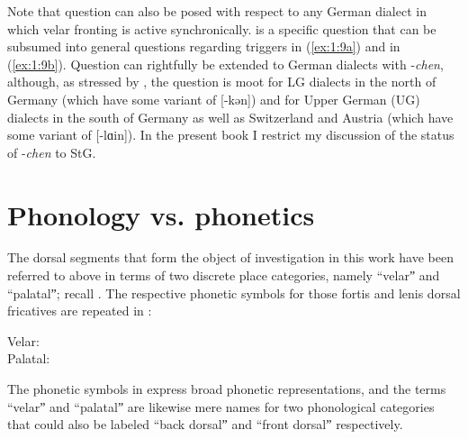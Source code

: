 Note that question  can also be posed with respect to any German dialect in which velar fronting is active synchronically.  is a specific question that can be subsumed into general questions regarding triggers in (\ref{ex:1:9a}) and  in (\ref{ex:1:9b}). Question  can rightfully be extended to German dialects with -\textit{chen}, although, as stressed by \citet{Robinson2001}, the question is moot for LG dialects in the north of Germany (which have some variant of [-kən]) and for Upper German (UG) dialects in the south of Germany as well as Switzerland and Austria (which have some variant of [-lɑin]). In the present book I restrict my discussion of the status of -\textit{chen} to StG.

\section{{Phonology} {vs.} {phonetics}}\label{sec:1.5}

The dorsal segments that form the object of investigation in this work have been referred to above in terms of two discrete place categories, namely “velarˮ and “palatalˮ; recall . The respective phonetic symbols for those fortis and lenis dorsal fricatives are repeated in :

\ea%
    \label{ex:1:13}
      Velar:   \tab  [x] \tab  [ɣ]\\
      Palatal: \tab  [ç] \tab [ʝ]
\z

The phonetic symbols in  express broad phonetic representations, and the terms “velarˮ and “palatalˮ are likewise mere names for two phonological categories that could also be labeled “back dorsalˮ and “front dorsalˮ respectively. 

